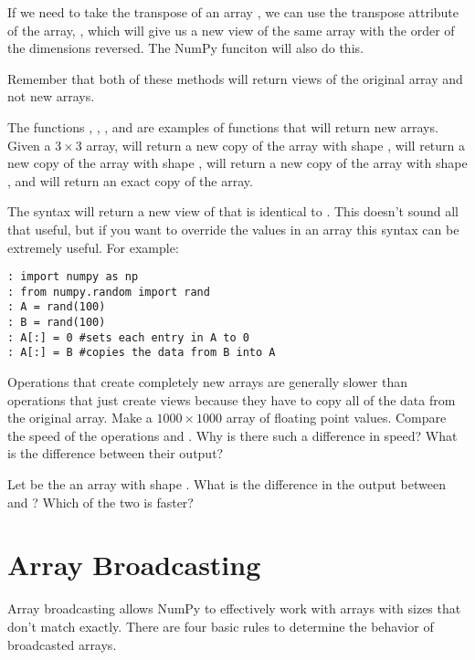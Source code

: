 If we need to take the transpose of an array , we can use the transpose attribute of the array, , which will give us a new view of the same array with the order of the dimensions reversed.
The NumPy  funciton will also do this.

Remember that both of these methods will return views of the original array and not new arrays.

The functions , , , and  are examples of functions that will return new arrays.
Given a $3 \times 3$ array,  will return a new copy of the array with shape ,  will return a new copy of the array with shape ,  will return a new copy of the array  with shape , and  will return an exact copy of the array.

The syntax  will return a new view of  that is identical to .
This doesn't sound all that useful, but if you want to override the values in an array this syntax can be extremely useful.
For example:
\begin{lstlisting}
: import numpy as np
: from numpy.random import rand
: A = rand(100)
: B = rand(100)
: A[:] = 0 #sets each entry in A to 0
: A[:] = B #copies the data from B into A
\end{lstlisting}

\begin{problem}
Operations that create completely new arrays are generally slower than operations that just create views because they have to copy all of the data from the original array.
Make  a $1000 \times 1000$ array of floating point values.
Compare the speed of the operations  and .
Why is there such a difference in speed?
What is the difference between their output?
\end{problem}

\begin{problem}
Let  be the an array with shape .
What is the difference in the output between  and ?
Which of the two is faster?
\end{problem}

\section*{Array Broadcasting}
Array broadcasting allows NumPy to effectively work with arrays with sizes that don't match exactly.
There are four basic rules to determine the behavior of broadcasted arrays.

